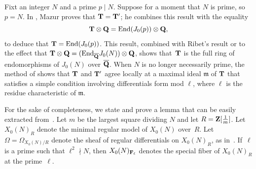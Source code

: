 \documentclass[10pt,twoside]{article}
\newcommand{\Z}{{\bf{Z}}}
\newcommand{\Q}{{\bf{Q}}}
\newcommand{\Qbar}{{\overline{\Q}}}
\newcommand{\F}{{\bf{F}}}
\newcommand{\T}{{\bf{T}}}
\newcommand{\m}{{\mathfrak{m}}}
\newcommand{\tensor}{\otimes}
\newcommand{\End}{{\rm End}}
\newcommand{\Fell}{\mathbf{F}_\ell}
\renewcommand{\H}{\HHH}
\newcommand{\comment}[1]{}
\theoremstyle{definition}
\DeclareMathOperator{\Supp}{Supp}
\DeclareMathOperator{\HHH}{H}
\begin{document}
Fixt an integer $N$ and a prime $p\mid N$.
Suppose for a moment that $N$ is prime, so $p=N$.
In \cite{mazur:eisenstein},
Mazur proves that $\T=\T'$; he combines this result with
the equality 
$$
  \T\tensor\Q = \End(J_0(p)) \tensor\Q,
$$ 
to deduce that $\T=\End(J_0(p))$.
This result, combined with Ribet's result 
\cite{ribet:endo} or \cite{ribet:endalg}
to the effect that $\T\tensor\Q = (\End_{\Qbar} J_0(N)) \tensor \Q$,
shows that~$\T$ is the full ring of endomorphisms of $J_0(N)$ over $\Qbar$.
When $N$ is no
longer necessarily prime,
the method of \cite{mazur:eisenstein} shows
that $\T$ and $\T'$ agree locally at a maximal ideal $\m$  of $\T$ 
that satisfies a simple condition involving 
differentials form mod $\ell$, where $\ell$ is the residue
characteristic of $\m$.  
\comment{
$\Supp_{\T}(\T'/\T)$ contains no maximal ideal $\m$ of~$\T$
for which his space $\H^0(X_0(pM)_{\Fell},\Omega)[\m]$ has
dimension $\leq 1$.  (Here $\ell$ is the residue characteristic
of $\m$.)  In other words, multiplicity one for 
$\H^0(X_0(pM)_{\Fell}, \Omega)[\m]$ implies that $\T$ and
$\T'$ agree at~$\m$.
Mazur's argument (see \cite[pg.~95]{mazur:eisenstein}) is quite
general; it relies on a multiplicity $1$ statement for spaces
of differentials in positive characteristic (see 
\cite[Prop.~9.3, pg.~94]{mazur:eisenstein}).  
}

For the sake of completeness, we state and prove a lemma
that can be easily extracted from~\cite{mazur:eisenstein}.  
Let $m$ be the largest square dividing $N$ and
let $R = \Z[\frac{1}{m}]$. Let $X_0(N)_{R}$ denote
the minimal regular model of $X_0(N)$ over~$R$.
Let $\Omega=\Omega_{X_0(N)/R}$ denote the sheaf of regular
differentials on $X_0(N)_{R}$, as in~\cite[\S2(e)]{mazur:rational}.
If~$\ell$ is a prime such that $\ell^2 \nmid N$, then
$X_0(N)_{\F_\ell}$ denotes the special fiber of $X_0(N)_{R}$ at the
prime~$\ell$.

\comment{
His method shows in 
the general case (where~$M$ is no longer constrained to be~$1$)
that $\Supp_{\T}(\T'/\T)$ contains no maximal ideal $\m$ of~$\T$
for which his space $\H^0(X_0(pM)_{\Fell},\Omega)[\m]$ has
dimension $\leq 1$.  (Here $\ell$ is the residue characteristic
of $\m$.)  In other words, multiplicity one for 
$\H^0(X_0(pM)_{\Fell}, \Omega)[\m]$ implies that $\T$ and
$\T'$ agree at~$\m$.  We record this fact as a lemma
(see also Section~\ref{sec:dataind} for related data).
}
\end{document}
